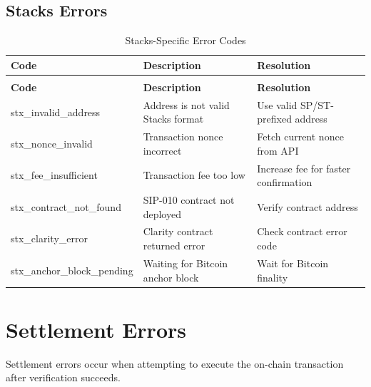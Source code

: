 \subsection{Stacks Errors}

\begin{longtable}{>{\ttfamily\footnotesize}l p{5cm} p{4cm}}
\caption{Stacks-Specific Error Codes} \label{tab:stacks-errors} \\
\toprule
\normalfont\textbf{Code} & \textbf{Description} & \textbf{Resolution} \\
\midrule
\endfirsthead
\multicolumn{3}{c}{\tablename\ \thetable\ -- continued} \\
\toprule
\normalfont\textbf{Code} & \textbf{Description} & \textbf{Resolution} \\
\midrule
\endhead
\midrule
\endfoot
\bottomrule
\endlastfoot
stx\_invalid\_address & Address is not valid Stacks format & Use valid SP/ST-prefixed address \\
stx\_nonce\_invalid & Transaction nonce incorrect & Fetch current nonce from API \\
stx\_fee\_insufficient & Transaction fee too low & Increase fee for faster confirmation \\
stx\_contract\_not\_found & SIP-010 contract not deployed & Verify contract address \\
stx\_clarity\_error & Clarity contract returned error & Check contract error code \\
stx\_anchor\_block\_pending & Waiting for Bitcoin anchor block & Wait for Bitcoin finality \\
\end{longtable}

\section{Settlement Errors}

Settlement errors occur when attempting to execute the on-chain transaction after verification succeeds.

